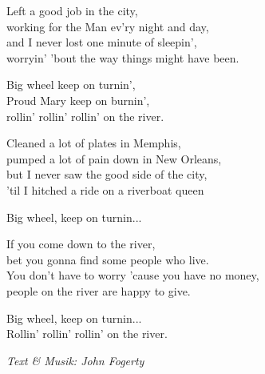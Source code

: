 \vspace{10pt}
Left a good job in the city,\\
working for the Man ev'ry night and day,\\
and I never lost one minute of sleepin',\\
worryin' 'bout the way things might have been.\par
\vspace{10pt}
Big wheel keep on turnin',\\
Proud Mary keep on burnin',\\
rollin' rollin' rollin' on the river.\par
\vspace{10pt}
Cleaned a lot of plates in Memphis,\\
pumped a lot of pain down in New Orleans,\\
but I never saw the good side of the city,\\
'til I hitched a ride on a riverboat queen\par
\vspace{10pt}
Big wheel, keep on turnin...\par
\vspace{10pt}
If you come down to the river,\\
bet you gonna find some people who live.\\
You don't have to worry 'cause you have no money,\\
people on the river are happy to give.\par
\vspace{10pt}
Big wheel, keep on turnin...\\
Rollin' rollin' rollin' on the river.
\par
\vspace{10pt}
{\footnotesize\textit{Text \& Musik: John Fogerty}}
